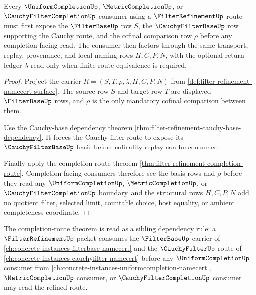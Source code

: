 \begin{theorem}
\label{thm:filter-refinement-cauchy-basis-consumer}
Every $\UniformCompletionUp$, $\MetricCompletionUp$, or $\CauchyFilterCompletionUp$ consumer using a $\FilterRefinementUp$ route must first expose the $\FilterBaseUp$ row $S$, the $\CauchyFilterBaseUp$ row supporting the Cauchy route, and the cofinal comparison row $\rho$ before any completion-facing read. The consumer then factors through the same transport, replay, provenance, and local naming rows $H,C,P,N$, with the optional return ledger $\lambda$ read only when finite route equivalence is required.
\end{theorem}
\begin{proof}
Project the carrier $R=(S,T,\rho,\lambda,H,C,P,N)$ from \autoref{def:filter-refinement-namecert-surface}. The source row $S$ and target row $T$ are displayed $\FilterBaseUp$ rows, and $\rho$ is the only mandatory cofinal comparison between them.

Use the Cauchy-base dependency theorem \autoref{thm:filter-refinement-cauchy-base-dependency}. It forces the Cauchy-filter route to expose its $\CauchyFilterBaseUp$ basis before cofinality replay can be consumed.

Finally apply the completion route theorem \autoref{thm:filter-refinement-completion-route}. Completion-facing consumers therefore see the basis rows and $\rho$ before they read any $\UniformCompletionUp$, $\MetricCompletionUp$, or $\CauchyFilterCompletionUp$ boundary, and the structural rows $H,C,P,N$ add no quotient filter, selected limit, countable choice, host equality, or ambient completeness coordinate.
\end{proof}

The completion-route theorem is read as a sibling dependency rule: a $\FilterRefinementUp$ packet consumes the $\FilterBaseUp$ carrier of \autoref{ch:concrete-instances-filterbase-namecert} and the $\CauchyFilterUp$ route of \autoref{ch:concrete-instances-cauchyfilter-namecert} before any $\UniformCompletionUp$ consumer from \autoref{ch:concrete-instances-uniformcompletion-namecert}, $\MetricCompletionUp$ consumer, or $\CauchyFilterCompletionUp$ consumer may read the refined route.


